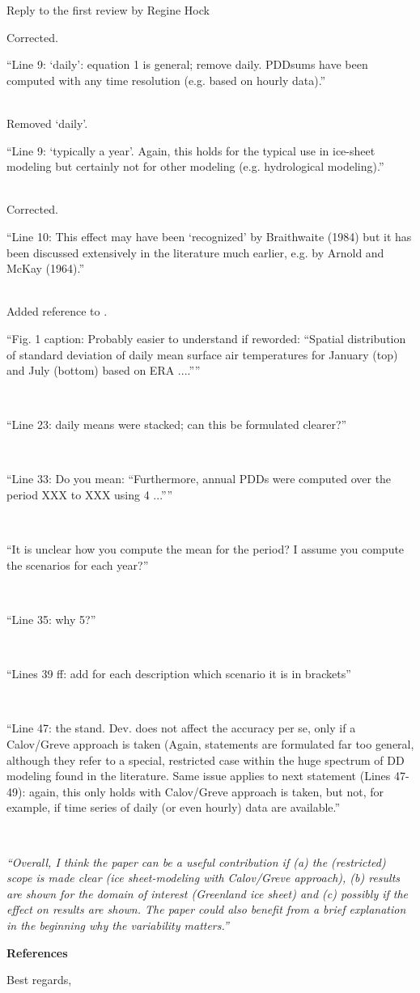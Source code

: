 \documentclass{letter}
\newcommand{\rev}[0]{\color{blue!50!black}\it}
\newcommand{\textrev}[1]{{\rev``#1''}}
\newcommand{\revpoint}[1]{{\rev\item``#1''}\\}
\begin{document}
\begin{letter}{Reply to the first review by Regine Hock}
\begin{enumerate}[resume]
    Corrected.

    \revpoint{Line 9: ‘daily’: equation 1 is general; remove daily. PDDsums have been computed with any time resolution (e.g. based on hourly data).}

    Removed `daily'.

    \revpoint{Line 9: ‘typically a year’. Again, this holds for the typical use in ice-sheet modeling but certainly not for other modeling (e.g. hydrological modeling).}

    Corrected.

    \revpoint{Line 10: This effect may have been ‘recognized’ by Braithwaite (1984) but it has been discussed extensively in the literature much earlier, e.g. by Arnold and McKay (1964).}

    Added reference to \citet{arnold-mckay-1964}.

    \revpoint{Fig. 1 caption: Probably easier to understand if reworded: “Spatial distribution of standard deviation of daily mean surface air temperatures for January (top) and July (bottom) based on ERA ....”}

    \revpoint{Line 23: daily means were stacked; can this be formulated clearer?}

    \revpoint{Line 33: Do you mean: “Furthermore, annual PDDs were computed over the period XXX to XXX using 4 ...”}

    \revpoint{It is unclear how you compute the mean for the period? I assume you compute the scenarios for each year?}

    \revpoint{Line 35: why 5?}

    \revpoint{Lines 39 ff: add for each description which scenario it is in brackets}

    \revpoint{Line 47: the stand. Dev. does not affect the accuracy per se, only if a Calov/Greve approach is taken (Again, statements are formulated far too general, although they refer to a special, restricted case within the huge spectrum of DD modeling found in the literature. Same issue applies to next statement (Lines 47- 49): again, this only holds with Calov/Greve approach is taken, but not, for example, if time series of daily (or even hourly) data are available.}

\end{enumerate}


\textrev{Overall, I think the paper can be a useful contribution if (a) the (restricted) scope is made clear (ice sheet-modeling with Calov/Greve approach), (b) results are shown for the domain of interest (Greenland ice sheet) and (c) possibly if the effect on results are shown. The paper could also benefit from a brief explanation in the beginning why the variability matters.}

\textbf{References}



\closing{Best regards,}

\end{letter}
\end{document}
